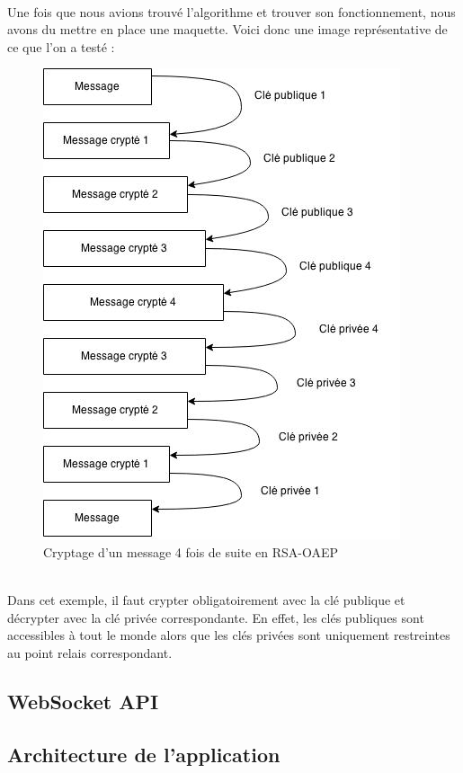 \documentclass[a4paper,12pt]{report}
\begin{document}
	\paragraph*{}
	Une fois que nous avions trouvé l'algorithme et trouver son fonctionnement, nous avons du mettre en place une maquette. Voici donc une image représentative de ce que l'on a testé :
	\begin{figure}[h] %
		\includegraphics[scale=0.70]{RSA.jpg}
		\caption{Cryptage d'un message 4 fois de suite en RSA-OAEP}
		\label{RSA}
	\end{figure}
	\\
	Dans cet exemple, il faut crypter obligatoirement avec la clé publique et décrypter avec la clé privée correspondante. En effet, les clés publiques sont accessibles à tout le monde alors que les clés privées sont uniquement restreintes au point relais correspondant.

	
	\subsection{WebSocket API}

	\subsection{Architecture de l'application}
\end{document}
